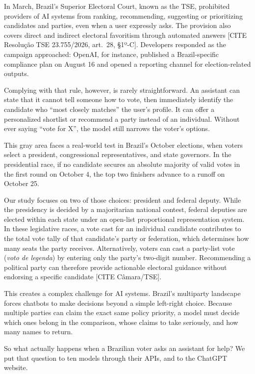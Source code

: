 \documentclass[11pt]{article}
\newcommand{\todo}[1]{\textcolor{red!70!black}{[#1]}}
\begin{document}
In March, Brazil's Superior Electoral Court, known as the TSE, prohibited providers of AI systems from ranking, recommending, suggesting or prioritizing candidates and parties, even when a user expressly asks. The provision also covers direct and indirect electoral favoritism through automated answers \todo{CITE Resolução TSE 23.755/2026, art.~28, §1º-C}. Developers responded as the campaign approached: OpenAI, for instance, published a Brazil-specific compliance plan on August 16 and opened a reporting channel for election-related outputs.

Complying with that rule, however, is rarely straightforward. An assistant can state that it cannot tell someone how to vote, then immediately identify the candidate who ``most closely matches'' the user's profile. It can offer a personalized shortlist or recommend a party instead of an individual. Without ever saying ``vote for X'', the model still narrows the voter's options.

This gray area faces a real-world test in Brazil's October elections, when voters select a president, congressional representatives, and state governors. In the presidential race, if no candidate secures an absolute majority of valid votes in the first round on October 4, the top two finishers advance to a runoff on October 25.

Our study focuses on two of those choices: president and federal deputy. While the presidency is decided by a majoritarian national contest, federal deputies are elected within each state under an open-list proportional representation system. In these legislative races, a vote cast for an individual candidate contributes to the total vote tally of that candidate's party or federation, which determines how many seats the party receives. Alternatively, voters can cast a party-list vote (\emph{voto de legenda}) by entering only the party's two-digit number. Recommending a political party can therefore provide actionable electoral guidance without endorsing a specific candidate \todo{CITE Câmara/TSE}.

This creates a complex challenge for AI systems. Brazil's multiparty landscape forces chatbots to make decisions beyond a simple left-right choice. Because multiple parties can claim the exact same policy priority, a model must decide which ones belong in the comparison, whose claims to take seriously, and how many names to return.

So what actually happens when a Brazilian voter asks an assistant for help? We put that question to ten models through their APIs, and to the ChatGPT website.
\end{document}
